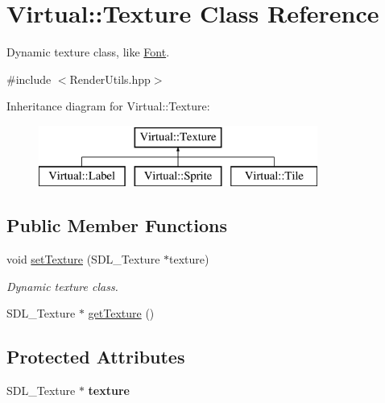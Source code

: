 \hypertarget{class_virtual_1_1_texture}{}\section{Virtual\+:\+:Texture Class Reference}
\label{class_virtual_1_1_texture}


Dynamic texture class, like \hyperlink{class_virtual_1_1_font}{Font}.  




{\ttfamily \#include $<$Render\+Utils.\+hpp$>$}

Inheritance diagram for Virtual\+:\+:Texture\+:\begin{figure}[H]
\begin{center}
\leavevmode
\includegraphics[height=2.000000cm]{class_virtual_1_1_texture}
\end{center}
\end{figure}
\subsection*{Public Member Functions}
\begin{DoxyCompactItemize}
\item 
void \hyperlink{class_virtual_1_1_texture_a8e0ffa6f92bfb5afab975a59f2b3b92f}{set\+Texture} (S\+D\+L\+\_\+\+Texture $\ast$texture)
\begin{DoxyCompactList}\small\item\em Dynamic texture class. \end{DoxyCompactList}\item 
S\+D\+L\+\_\+\+Texture $\ast$ \hyperlink{class_virtual_1_1_texture_a5c870d3c9b6db63922aa5cf451cd3422}{get\+Texture} ()
\end{DoxyCompactItemize}
\subsection*{Protected Attributes}
\begin{DoxyCompactItemize}
\item 
\hypertarget{class_virtual_1_1_texture_ae0101cbb0799e438722a16da7f25653a}{}\label{class_virtual_1_1_texture_ae0101cbb0799e438722a16da7f25653a} 
S\+D\+L\+\_\+\+Texture $\ast$ {\bfseries texture}
\end{DoxyCompactItemize}



